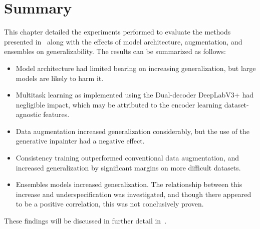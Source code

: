 \section{Summary}
This chapter detailed the experiments performed to evaluate the methods presented in~ along with the effects of model architecture, augmentation, and ensembles on generalizability. The results can be summarized as follows:
\begin{itemize}
    \item Model architecture had limited bearing on increasing generalization, but large models are likely to harm it.
    \item Multitask learning as implemented using the Dual-decoder DeepLabV3+ had negligible impact, which may be attributed to the encoder learning dataset-agnostic features.
    \item Data augmentation increased generalization considerably, but the use of the generative inpainter had a negative effect.
    \item Consistency training outperformed conventional data augmentation, and increased generalization by significant margins on more difficult datasets.
    \item Ensembles models increased generalization. The relationship between this increase and underspecification was investigated, and though there appeared to be a positive correlation, this was not conclusively proven.
\end{itemize}

These findings will be discussed in further detail in~. 
